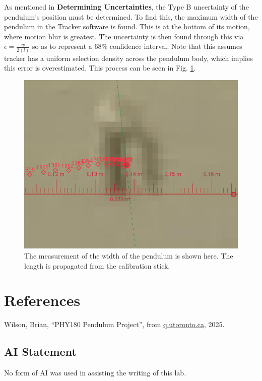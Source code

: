 \documentclass[prl,twocolumn,amsmath,amssymb,superscriptaddress]{revtex4-2}
\begin{document}
As mentioned in \textbf{Determining Uncertainties}, the Type B uncertainty of the pendulum's position must be determined. To find this, the maximum width of the pendulum in the Tracker software is found. This is at the bottom of its motion, where motion blur is greatest. The uncertainty is then found through this via $\epsilon = \frac{w}{2(l)}$ so as to represent a 68\% confidence interval. Note that this assumes tracker has a uniform selection density across the pendulum body, which implies this error is overestimated. This process can be seen in Fig. \ref{fig:body}.
\begin{figure}[htb]
    \includegraphics[width=0.2\linewidth]{pendulum-body.png}
    \caption{The measurement of the width of the pendulum is shown here. The length is propagated from the calibration stick.}
    \label{fig:body}
\end{figure}

\newpage

\section{References}

Wilson, Brian, “PHY180 Pendulum Project”, from
\href{https://q.utoronto.ca/courses/411727/files/39071655?module_item_id=7122439}{q.utoronto.ca}, 2025.


\subsection{AI Statement}

No form of AI was used in assisting the writing of this lab.
\end{document}
